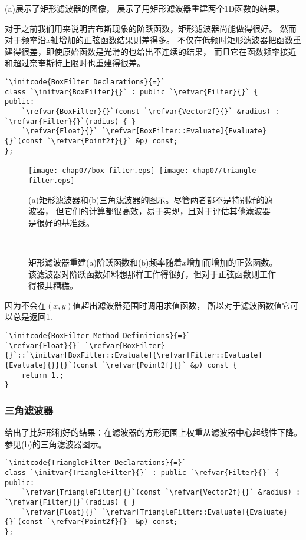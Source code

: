 (a)展示了矩形滤波器的图像，
展示了用矩形滤波器重建两个1D函数的结果。

对于之前我们用来说明吉布斯现象的阶跃函数，矩形滤波器尚能做得很好。
然而对于频率沿$x$轴增加的正弦函数结果则差得多。
不仅在低频时矩形滤波器把函数重建得很差，即使原始函数是光滑的也给出不连续的结果，
而且它在函数频率接近和超过奈奎斯特上限时也重建得很差。
\begin{lstlisting}
`\initcode{BoxFilter Declarations}{=}`
class `\initvar{BoxFilter}{}` : public `\refvar{Filter}{}` {
public:
    `\refvar{BoxFilter}{}`(const `\refvar{Vector2f}{}` &radius) : `\refvar{Filter}{}`(radius) { }
    `\refvar{Float}{}` `\refvar[BoxFilter::Evaluate]{Evaluate}{}`(const `\refvar{Point2f}{}` &p) const;
};
\end{lstlisting}

\begin{figure}[htbp]
    \centering
    \texttt{[image: chap07/box-filter.eps]}\,
    \texttt{[image: chap07/triangle-filter.eps]}
    \caption{(a)矩形滤波器和(b)三角滤波器的图示。尽管两者都不是特别好的滤波器，
        但它们的计算都很高效，易于实现，且对于评估其他滤波器是很好的基准线。}
    \label{fig:7.41}
\end{figure}
\begin{figure}[htbp]
    \centering
    \,
    \caption{矩形滤波器重建(a)阶跃函数和(b)频率随着$x$增加而增加的正弦函数。
        该滤波器对阶跃函数如料想那样工作得很好，但对于正弦函数则工作得极其糟糕。}
    \label{fig:7.42}
\end{figure}

因为不会在$(x,y)$值超出滤波器范围时调用求值函数，
所以对于滤波函数值它可以总是返回1.
\begin{lstlisting}
`\initcode{BoxFilter Method Definitions}{=}`
`\refvar{Float}{}` `\refvar{BoxFilter}{}`::`\initvar[BoxFilter::Evaluate]{\refvar[Filter::Evaluate]{Evaluate}{}}{}`(const `\refvar{Point2f}{}` &p) const {
    return 1.;
}
\end{lstlisting}

\subsubsection*{三角滤波器}
给出了比矩形稍好的结果：在滤波器的方形范围上权重从滤波器中心起线性下降。
参见(b)的三角滤波器图示。
\begin{lstlisting}
`\initcode{TriangleFilter Declarations}{=}`
class `\initvar{TriangleFilter}{}` : public `\refvar{Filter}{}` {
public:
    `\refvar{TriangleFilter}{}`(const `\refvar{Vector2f}{}` &radius) : `\refvar{Filter}{}`(radius) { }
    `\refvar{Float}{}` `\refvar[TriangleFilter::Evaluate]{Evaluate}{}`(const `\refvar{Point2f}{}` &p) const;
};
\end{lstlisting}

